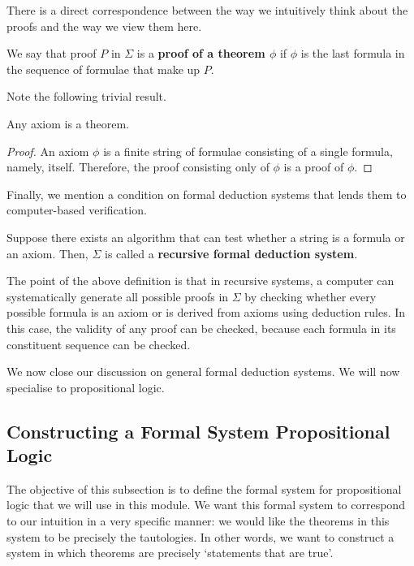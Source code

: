 There is a direct correspondence between the way we intuitively think about the proofs and the way we view them here.

\begin{boxconvention}
    We say that proof $P$ in $\Sigma$ is a \textbf{proof of a theorem $\phi$} if $\phi$ is the last formula in the sequence of formulae that make up $P$.
\end{boxconvention}

Note the following trivial result.

\begin{boxlemma}
    Any axiom is a theorem.
\end{boxlemma}
\begin{proof}
    An axiom $\phi$ is a finite string of formulae consisting of a single formula, namely, itself. Therefore, the proof consisting only of $\phi$ is a proof of $\phi$.
\end{proof}

Finally, we mention a condition on formal deduction systems that lends them to computer-based verification.

\begin{boxdefinition}
    Suppose there exists an algorithm that can test whether a string is a formula or an axiom. Then, $\Sigma$ is called a \textbf{recursive formal deduction system}.
\end{boxdefinition}

The point of the above definition is that in recursive systems, a computer can systematically generate all possible proofs in $\Sigma$ by checking whether every possible formula is an axiom or is derived from axioms using deduction rules. In this case, the validity of any proof can be checked, because each formula in its constituent sequence can be checked.

We now close our discussion on general formal deduction systems. We will now specialise to propositional logic.

\subsection{Constructing a Formal System Propositional Logic}

The objective of this subsection is to define the formal system for propositional logic that we will use in this module. We want this formal system to correspond to our intuition in a very specific manner: we would like the theorems in this system to be precisely the tautologies. In other words, we want to construct a system in which theorems are precisely `statements that are true'.

